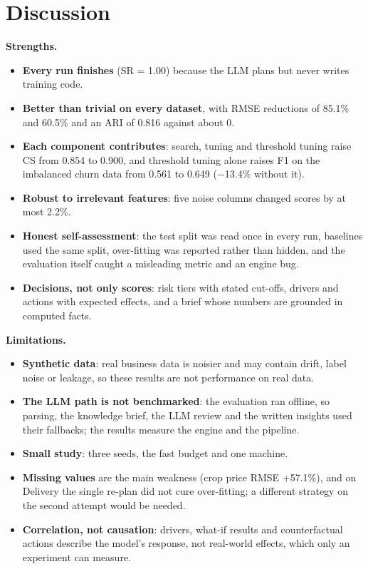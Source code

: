 \FloatBarrier
\section{Discussion}\label{sec:7.10}

\textbf{Strengths.}

\begin{itemize}
  \item \textbf{Every run finishes} (SR = 1.00) because the LLM plans but never writes training code.
  \item \textbf{Better than trivial on every dataset}, with RMSE reductions of 85.1\% and 60.5\% and an ARI of 0.816 against about 0.
  \item \textbf{Each component contributes}: search, tuning and threshold tuning raise CS from 0.854 to 0.900, and threshold tuning alone raises F1 on the imbalanced churn data from 0.561 to 0.649 (\ensuremath{-}13.4\% without it).
  \item \textbf{Robust to irrelevant features}: five noise columns changed scores by at most 2.2\%.
  \item \textbf{Honest self-assessment}: the test split was read once in every run, baselines used the same split, over-fitting was reported rather than hidden, and the evaluation itself caught a misleading metric and an engine bug.
  \item \textbf{Decisions, not only scores}: risk tiers with stated cut-offs, drivers and actions with expected effects, and a brief whose numbers are grounded in computed facts.
\end{itemize}

\textbf{Limitations.}

\begin{itemize}
  \item \textbf{Synthetic data}: real business data is noisier and may contain drift, label noise or leakage, so these results are not performance on real data.
  \item \textbf{The LLM path is not benchmarked}: the evaluation ran offline, so parsing, the knowledge brief, the LLM review and the written insights used their fallbacks; the results measure the engine and the pipeline.
  \item \textbf{Small study}: three seeds, the fast budget and one machine.
  \item \textbf{Missing values} are the main weakness (crop price RMSE +57.1\%), and on Delivery the single re-plan did not cure over-fitting; a different strategy on the second attempt would be needed.
  \item \textbf{Correlation, not causation}: drivers, what-if results and counterfactual actions describe the model's response, not real-world effects, which only an experiment can measure.
\end{itemize}

